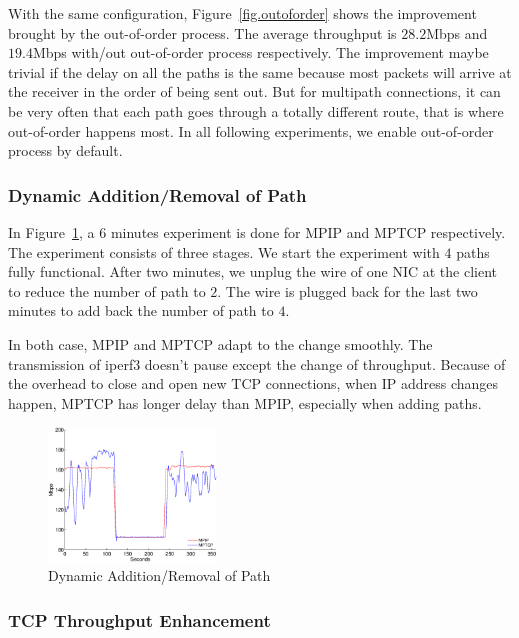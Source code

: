 With the same configuration, Figure~\ref{fig.outoforder} shows the improvement brought by the out-of-order process. The average throughput is $28.2$Mbps and $19.4$Mbps with/out out-of-order process respectively. The improvement maybe trivial if the delay on all the paths is the same because most packets will arrive at the receiver in the order of being sent out. But for multipath connections, it can be very often that each path goes through a totally different route, that is where out-of-order happens most. In all following experiments, we enable out-of-order process by default.

\subsubsection{Dynamic Addition/Removal of Path}
\label{sec:switch_evaluation}

In Figure~\ref{fig.switch}, a $6$ minutes experiment is done for MPIP and MPTCP respectively. The experiment consists of three stages. We start the experiment with $4$ paths fully functional. After two minutes, we unplug the wire of one NIC at the client to reduce the number of path to $2$. The wire is plugged back for the last two minutes to add back the number of path to $4$.

In both case, MPIP and MPTCP adapt to the change smoothly. The transmission of iperf3 doesn't pause except the change of throughput. Because of the overhead to close and open new TCP connections, when IP address changes happen, MPTCP has longer delay than MPIP, especially when adding paths.

\begin{figure}[htb]
\centering
\includegraphics[width=0.8\linewidth,height=1.4in]{fig/switch.eps}
\caption{Dynamic Addition/Removal of Path}
\label{fig.switch}
\end{figure}


\subsubsection{TCP Throughput Enhancement}
\label{sec:tcptp}

